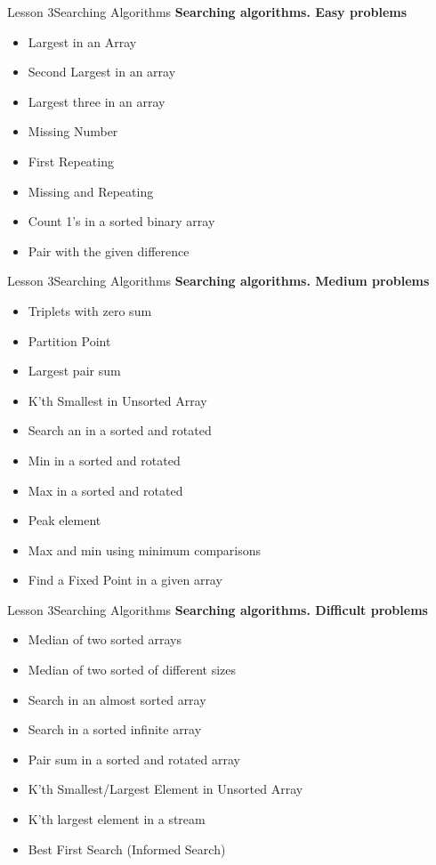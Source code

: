 \documentclass[aspectratio=1610]{beamer}
\begin{document}
\begin{frame}{Lesson 3}{Searching Algorithms}
\LARGE
\textbf{Searching algorithms. Easy problems}\\
\Large
\begin{itemize}
	\item Largest in an Array
	\item Second Largest in an array
	\item Largest three in an array
	\item Missing Number
	\item First Repeating
	\item Missing and Repeating
	\item Count 1’s in a sorted binary array
	\item Pair with the given difference
\end{itemize}
\end{frame}


\begin{frame}{Lesson 3}{Searching Algorithms}
\LARGE
\textbf{Searching algorithms. Medium problems}\\
\Large
\begin{itemize}
    \item Triplets with zero sum
    \item Partition Point
    \item Largest pair sum
    \item K’th Smallest in Unsorted Array
    \item Search an in a sorted and rotated
    \item Min in a sorted and rotated
    \item Max in a sorted and rotated
    \item Peak element
    \item Max and min using minimum comparisons
    \item Find a Fixed Point in a given array
\end{itemize}
\end{frame}


\begin{frame}{Lesson 3}{Searching Algorithms}
\LARGE
\textbf{Searching algorithms. Difficult problems}\\
\Large
\begin{itemize}
    \item Median of two sorted arrays
    \item Median of two sorted of different sizes
    \item Search in an almost sorted array
    \item Search in a sorted infinite array
    \item Pair sum in a sorted and rotated array
    \item K’th Smallest/Largest Element in Unsorted Array
    \item K’th largest element in a stream
    \item Best First Search (Informed Search)
\end{itemize}
\end{frame}
\end{document}
